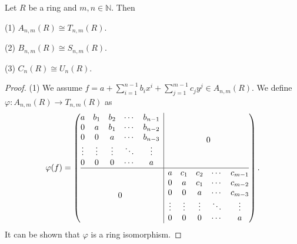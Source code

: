 \documentclass[10pt,a4paper]{amsart}
\newcommand{\bigzero}{\mbox{\normalfont\Large\bfseries 0}}
\begin{document}
\begin{lemma} \label{section 3 lemma}
    Let $R$ be a ring and $m, n \in \mathbb{N}$. Then
    
(1) $A_{n,m}(R) \cong T_{n,m}(R)$.

(2) $B_{n,m}(R) \cong S_{n,m}(R)$.

(3) $C_{n}(R) \cong U_{n}(R)$.
\end{lemma}

\begin{proof}
(1) We assume $f = a+ \sum_{i=1}^{n-1}b_ix^i + \sum_{j=1}^{m-1}c_jy^j \in A_{n,m}(R)$. We define $\varphi:  A_{n,m}(R) \to  T_{n,m}(R)$ as 
$$\varphi(f)=
\left(\begin{array}{@{}c|c@{}}
  \begin{matrix}
  a & b_1 & b_2 & \cdots & b_{n-1} \\
  0 & a & b_1 & \cdots & b_{n-2} \\
  0 & 0 & a & \cdots & b_{n-3} \\
  \vdots & \vdots & \vdots & \ddots & \vdots \\
  0 & 0 & 0 & \cdots & a
  \end{matrix}
  &\bigzero \\
\hline
  \bigzero &
  \begin{matrix}
  a & c_1 & c_2 & \cdots & c_{m-1} \\
  0 & a & c_1 & \cdots & c_{m-2} \\
  0 & 0 & a & \cdots & c_{m-3} \\
  \vdots & \vdots & \vdots & \ddots & \vdots \\
  0 & 0 & 0 & \cdots & a
  \end{matrix}
\end{array}\right). $$
It can be shown that $\varphi$ is a ring isomorphism.


\end{proof}
\end{document}
